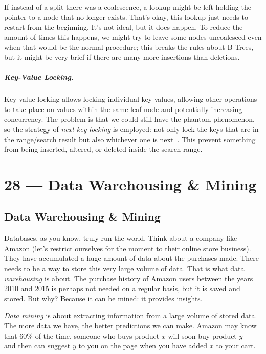 \documentclass[a4paper]{report}
\begin{document}
If instead of a split there was a coalescence, a lookup might be left holding the pointer to a node that no longer exists. That's okay, this lookup just needs to restart from the beginning. It's not ideal, but it does happen. To reduce the amount of times this happens, we might try to leave some nodes uncoalesced even when that would be the normal procedure; this breaks the rules about B-Trees, but it might be very brief if there are many more insertions than deletions.

\paragraph{Key-Value Locking.} Key-value locking allows locking individual key values, allowing other operations to take place on values within the same leaf node and potentially increasing concurrency. The problem is that we could still have the phantom phenomenon, so the strategy of \textit{next key locking} is employed: not only lock the keys that are in the range/search result but also whichever one is next~\cite{dsc}. This prevent something from being inserted, altered, or deleted inside the search range. 









\chapter*{28 --- Data Warehousing \& Mining}


\section*{Data Warehousing \& Mining}

Databases, as you know, truly run the world. Think about a company like Amazon (let's restrict ourselves for the moment to their online store business). They have accumulated a huge amount of data about the purchases made. There needs to be a way to store this very large volume of data. That is what data \textit{warehousing} is about. The purchase history of Amazon users between the years 2010 and 2015 is perhaps not needed on a regular basis, but it is saved and stored. But why? Because it can be mined: it provides insights.

\textit{Data mining} is about extracting information from a large volume of stored data.  The more data we have, the better predictions we can make. Amazon may know that 60\% of the time, someone who buys product $x$ will soon buy product $y$ -- and then can suggest $y$ to you on the page when you have added $x$ to your cart.
\end{document}
